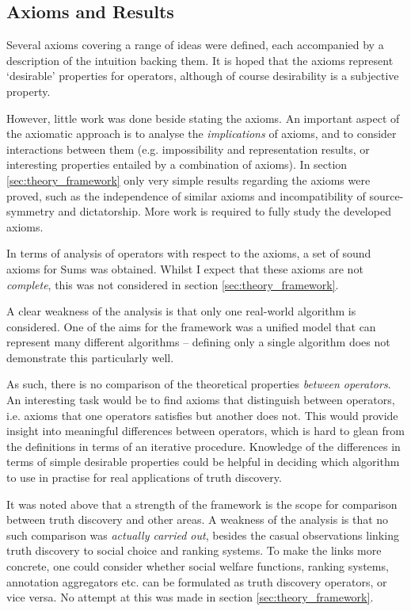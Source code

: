 \documentclass[../../main.tex]{subfiles}
\begin{document}
\subsection*{Axioms and Results}

Several axioms covering a range of ideas were defined, each accompanied by a
description of the intuition backing them. It is hoped that the axioms
represent `desirable' properties for operators, although of course desirability
is a subjective property.

However, little work was done beside stating the axioms. An important aspect of
the axiomatic approach is to analyse the \emph{implications} of axioms, and to
consider interactions between them (e.g. impossibility and representation
results, or interesting properties entailed by a combination of axioms). In
section \ref{sec:theory_framework} only very simple results regarding the
axioms were proved, such as the independence of similar axioms and
incompatibility of source-symmetry and dictatorship. More work is required to
fully study the developed axioms.

In terms of analysis of operators with respect to the axioms, a set of sound
axioms for Sums was obtained. Whilst I expect that these axioms are not
\emph{complete}, this was not considered in section \ref{sec:theory_framework}.

A clear weakness of the analysis is that only one real-world algorithm is
considered. One of the aims for the framework was a unified model that can
represent many different algorithms -- defining only a single algorithm does
not demonstrate this particularly well.

As such, there is no comparison of the theoretical properties \emph{between
operators}. An interesting task would be to find axioms that distinguish
between operators, i.e. axioms that one operators satisfies but another does
not. This would provide insight into meaningful differences between operators,
which is hard to glean from the definitions in terms of an iterative procedure.
Knowledge of the differences in terms of simple desirable properties could be
helpful in deciding which algorithm to use in practise for real applications of
truth discovery.

It was noted above that a strength of the framework is the scope for comparison
between truth discovery and other areas. A weakness of the analysis is that no
such comparison was \emph{actually carried out}, besides the casual
observations linking truth discovery to social choice and ranking systems. To
make the links more concrete, one could consider whether social welfare
functions, ranking systems, annotation aggregators etc. can be formulated as
truth discovery operators, or vice versa. No attempt at this was made in
section \ref{sec:theory_framework}.
\end{document}
